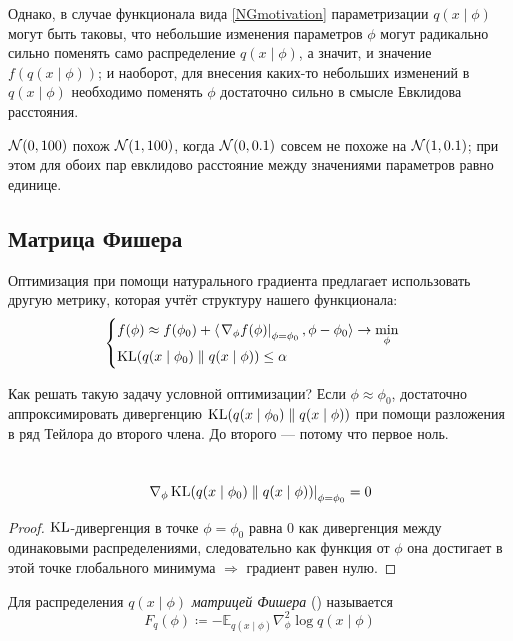 Однако, в случае функционала вида \eqref{NGmotivation} параметризации $q(x \mid \phi)$ могут быть таковы, что небольшие изменения параметров $\phi$ могут радикально сильно поменять само распределение $q(x \mid \phi)$, а значит, и значение $f(q(x \mid \phi))$; и наоборот, для внесения каких-то небольших изменений в $q(x \mid \phi)$ необходимо поменять $\phi$ достаточно сильно в смысле Евклидова расстояния.

\begin{example}
$\mathcal{N}(0, 100)$ похож $\mathcal{N}(1, 100)$, когда $\mathcal{N}(0, 0.1)$ совсем не похоже на $\mathcal{N}(1, 0.1)$; при этом для обоих пар евклидово расстояние между значениями параметров равно единице.
\end{example} 

\subsection{Матрица Фишера}\label{appendix:fishermatrix}

Оптимизация при помощи натурального градиента предлагает использовать другую метрику, которая учтёт структуру нашего функционала:
$$\begin{cases}
f(\phi) \approx f(\phi_0) + \langle \left. \nabla_\phi f(\phi) \right|_{\phi = \phi_0}, \phi - \phi_0 \rangle \to \min\limits_{\phi} \\
\operatorname{KL} (q(x \mid \phi_0) \parallel q(x \mid \phi)) \le \alpha
\end{cases}$$

Как решать такую задачу условной оптимизации? Если $\phi \approx \phi_0$, достаточно аппроксимировать дивергенцию $\operatorname{KL} (q(x \mid \phi_0) \parallel q(x \mid \phi))$ при помощи разложения в ряд Тейлора до второго члена. До второго --- потому что первое ноль.

\begin{proposition}\,
\begin{equation*}
\left. \nabla_{\phi} \operatorname{KL} (q(x \mid \phi_0) \parallel q(x \mid \phi)) \right|_{\phi = \phi_0} = 0
\end{equation*}
\begin{proof}
$\operatorname{KL}$-дивергенция в точке $\phi = \phi_0$ равна 0 как дивергенция между одинаковыми распределениями, следовательно как функция от $\phi$ она достигает в этой точке глобального минимума $\Rightarrow$ градиент равен нулю.
\end{proof}
\end{proposition}

\begin{definition}
Для распределения $q(x \mid \phi)$ \emph{матрицей Фишера} () называется
$$F_q(\phi) \coloneqq -\mathbb{E}_{q(x \mid \phi)} \nabla^2_\phi \log q(x \mid \phi)$$
\end{definition}

